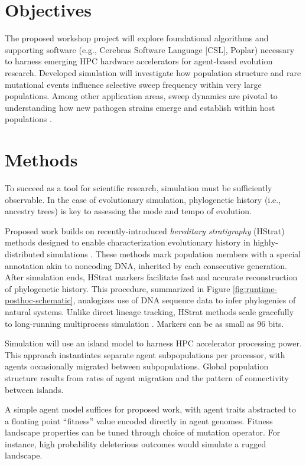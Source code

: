 \section{Objectives}

The proposed workshop project will explore foundational algorithms and supporting software (e.g., Cerebras Software Language [CSL], Poplar) necessary to harness emerging HPC hardware accelerators for agent-based evolution research.
Developed simulation will investigate how population structure and rare mutational events influence selective sweep frequency within very large populations.
Among other application areas, sweep dynamics are pivotal to understanding how new pathogen strains emerge and establish within host populations \cite{markov2023evolution}.

\section{Methods}

To succeed as a tool for scientific research, simulation must be sufficiently observable.
In the case of evolutionary simulation, phylogenetic history (i.e., ancestry trees) is key to assessing the mode and tempo of evolution.



Proposed work builds on recently-introduced \textit{hereditary stratigraphy} (HStrat) methods designed to enable characterization evolutionary history in highly-distributed simulations \cite{moreno2022hstrat}.
These methods mark population members with a special annotation akin to noncoding DNA, inherited by each consecutive generation.
After simulation ends, HStrat markers facilitate fast and accurate reconstruction of phylogenetic history.
This procedure, summarized in Figure \ref{fig:runtime-posthoc-schematic}, analogizes use of DNA sequence data to infer phylogenies of natural systems.
Unlike direct lineage tracking, HStrat methods scale gracefully to long-running multiprocess simulation \cite{moreno2024analysis}.
Markers can be as small as 96 bits.

Simulation will use an island model to harness HPC accelerator processing power.
This approach instantiates separate agent subpopulations per processor, with agents occasionally migrated between subpopulations.
Global population structure results from rates of agent migration and the pattern of connectivity between islands.

A simple agent model suffices for proposed work, with agent traits abstracted to a floating point ``fitness'' value encoded directly in agent genomes.
Fitness landscape properties can be tuned through choice of mutation operator.
For instance, high probability deleterious outcomes would simulate a rugged landscape.

